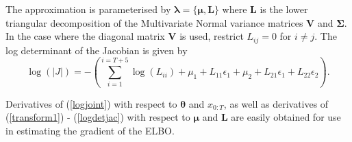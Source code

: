 \documentclass[12pt,a4paper]{article}%
\numberwithin{equation}{section}
\begin{document}
The approximation is parameterised by $\boldsymbol{\lambda} = \{ \boldsymbol{\mu}, \textbf{L} \}$ where $\textbf{L}$ is the lower triangular decomposition of the Multivariate Normal variance matrices $\textbf{V}$ and $\boldsymbol{\Sigma}$. In the case where the diagonal matrix $\textbf{V}$ is used, restrict $L_{ij} = 0$ for $i \neq j$.
The log determinant of the Jacobian is given by
\begin{equation}
\label{logdetjac}
\log(|J|) = - \left(\sum_{i = 1}^{i = T+5} \log(L_{ii}) + \mu_1 + L_{11} \epsilon_1 + \mu_2 + L_{21} \epsilon_1 + L_{22} \epsilon_2\right).  
\end{equation}

Derivatives of (\ref{logjoint}) with respect to $\boldsymbol{\theta}$ and $x_{0:T}$, as well as derivatives of (\ref{transform1}) - (\ref{logdetjac}) with respect to $\boldsymbol{\mu}$ and $\textbf{L}$ are easily obtained for use in estimating the gradient of the ELBO.
\end{document}
